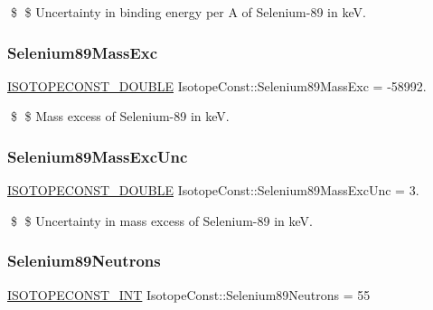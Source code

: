 \$ \$ Uncertainty in binding energy per A of Selenium-\/89 in keV. \mbox{\label{group___isotope_const-_selenium-_se89_gab34968ab9e4de53cbaccda75d1064a23}} 
\subsubsection{\texorpdfstring{Selenium89\+Mass\+Exc}{Selenium89MassExc}}
{\footnotesize\ttfamily \mbox{\hyperlink{group___isotope_const-_macros_ga8f45a7272ce02c0b4c65c44636ed719a}{I\+S\+O\+T\+O\+P\+E\+C\+O\+N\+S\+T\+\_\+\+D\+O\+U\+B\+LE}} Isotope\+Const\+::\+Selenium89\+Mass\+Exc = -\/58992.}

\$ \$ Mass excess of Selenium-\/89 in keV. \mbox{\label{group___isotope_const-_selenium-_se89_gaacfed4be22d9175470166822519fde07}} 
\subsubsection{\texorpdfstring{Selenium89\+Mass\+Exc\+Unc}{Selenium89MassExcUnc}}
{\footnotesize\ttfamily \mbox{\hyperlink{group___isotope_const-_macros_ga8f45a7272ce02c0b4c65c44636ed719a}{I\+S\+O\+T\+O\+P\+E\+C\+O\+N\+S\+T\+\_\+\+D\+O\+U\+B\+LE}} Isotope\+Const\+::\+Selenium89\+Mass\+Exc\+Unc = 3.}

\$ \$ Uncertainty in mass excess of Selenium-\/89 in keV. \mbox{\label{group___isotope_const-_selenium-_se89_ga22b5469dd0fd31af8bc3a56d8a94db40}} 
\subsubsection{\texorpdfstring{Selenium89\+Neutrons}{Selenium89Neutrons}}
{\footnotesize\ttfamily \mbox{\hyperlink{group___isotope_const-_macros_ga5f18360b3e99483a35c32d789e62621c}{I\+S\+O\+T\+O\+P\+E\+C\+O\+N\+S\+T\+\_\+\+I\+NT}} Isotope\+Const\+::\+Selenium89\+Neutrons = 55}


